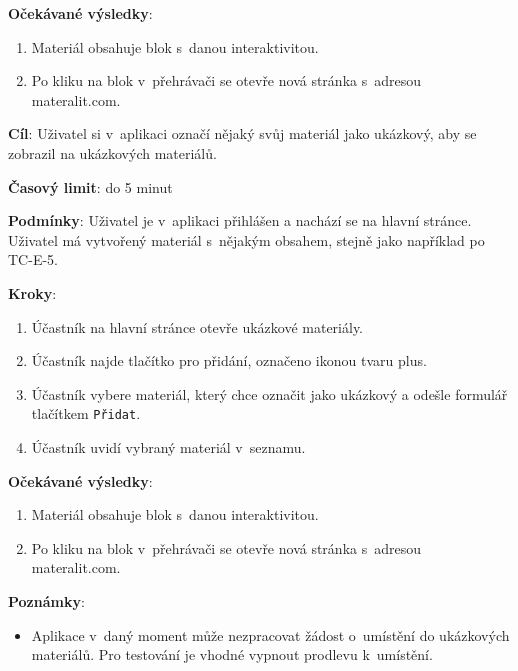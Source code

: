 \textbf{Očekávané výsledky}:

\begin{enumerate}[leftmargin=1.4cm]
    \item Materiál obsahuje blok s~danou interaktivitou.
    \item Po kliku na blok v~přehrávači se otevře nová stránka s~adresou materalit.com.
\end{enumerate}




\vspace{1em}

\textbf{Cíl}: Uživatel si v~aplikaci označí nějaký svůj materiál jako ukázkový, aby se zobrazil na ukázkových materiálů.

\textbf{Časový limit}: do 5 minut

\textbf{Podmínky}:  Uživatel je v~aplikaci přihlášen a nachází se na hlavní stránce.  Uživatel má vytvořený materiál s~nějakým obsahem, stejně jako například po TC-E-5.

\textbf{Kroky}:

\begin{enumerate}[leftmargin=1.4cm]
    \item Účastník na hlavní stránce otevře ukázkové materiály.
    \item Účastník najde tlačítko pro přidání, označeno ikonou tvaru plus.
    \item Účastník vybere materiál, který chce označit jako ukázkový a odešle formulář tlačítkem \verb|Přidat|.
    \item Účastník uvidí vybraný materiál v~seznamu.
\end{enumerate}

\textbf{Očekávané výsledky}:

\begin{enumerate}[leftmargin=1.4cm]
    \item Materiál obsahuje blok s~danou interaktivitou.
    \item Po kliku na blok v~přehrávači se otevře nová stránka s~adresou materalit.com.
\end{enumerate}

\textbf{Poznámky}:

\begin{itemize}[leftmargin=1.4cm]
    \item Aplikace v~daný moment může nezpracovat žádost o~umístění do ukázkových materiálů. Pro testování je vhodné vypnout prodlevu k~umístění.
\end{itemize}





